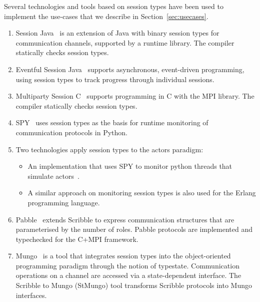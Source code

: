 Several technologies and tools based on session types have been used to implement the use-cases that we describe in Section~\ref{sec:usecases}.
%
\begin{enumerate}
	\item	Session Java~\cite{HU07TYPE-SAFE} is an extension of Java with binary session types for communication channels, supported by a runtime library. The compiler statically checks session types. 

	\item	Eventful Session Java~\cite{event} supports asynchronous, event-driven programming, using session types to track progress through individual sessions.

	\item	Multiparty Session C~\cite{NYH12} supports programming in C with the MPI library. The compiler statically checks session types. 

	\item	SPY~\cite{DBLP:conf/rv/NeykovaYH13} uses session types as the basis for runtime monitoring of communication protocols in Python.

	\item	Two technologies apply session types to the actors paradigm:
			\begin{itemize}
				\item	An implementation that uses SPY to
						monitor python threads that simulate actors~\cite{DBLP:conf/coordination/NeykovaY14}.
				\item	A similar approach on monitoring session types is also used for the
						Erlang programming language. %
			\end{itemize}

	\item	Pabble~\cite{DBLP:conf/pdp/NgY14} extends Scribble to express
			communication structures that are parameterised by the number of roles.
			Pabble protocols are implemented and typechecked for the C+MPI framework.

	\item	Mungo~\cite{mungo} is a tool that integrates session types into the object-oriented
			programming paradigm through the notion of typestate. Communication
			operations on a channel are accessed via a state-dependent interface.
			The Scribble to Mungo (StMungo) tool transforms Scribble
			protocols into Mungo interfaces.



\end{enumerate}
